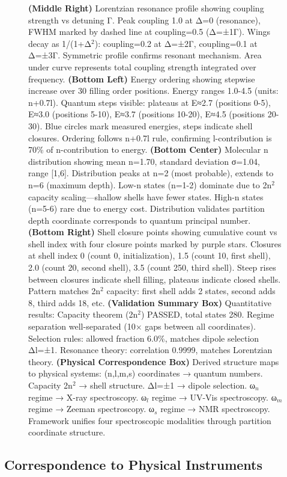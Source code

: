 \begin{figure}[htbp]
{    \textbf{(Middle Right)} Lorentzian resonance profile showing coupling strength vs detuning Γ. Peak coupling 1.0 at Δ=0 (resonance), FWHM marked by dashed line at coupling=0.5 (Δ=±1Γ). Wings decay as 1/(1+Δ$^2$): coupling=0.2 at Δ=±2Γ, coupling=0.1 at Δ=±3Γ. Symmetric profile confirms resonant mechanism. Area under curve represents total coupling strength integrated over frequency. 
    \textbf{(Bottom Left)} Energy ordering showing stepwise increase over 30 filling order positions. Energy ranges 1.0-4.5 (units: n+0.7l). Quantum steps visible: plateaus at E≈2.7 (positions 0-5), E≈3.0 (positions 5-10), E≈3.7 (positions 10-20), E≈4.5 (positions 20-30). Blue circles mark measured energies, steps indicate shell closures. Ordering follows n+0.7l rule, confirming l-contribution is 70\% of n-contribution to energy. 
    \textbf{(Bottom Center)} Molecular n distribution showing mean n=1.70, standard deviation σ=1.04, range [1,6]. Distribution peaks at n=2 (most probable), extends to n=6 (maximum depth). Low-n states (n=1-2) dominate due to 2n$^2$ capacity scaling—shallow shells have fewer states. High-n states (n=5-6) rare due to energy cost. Distribution validates partition depth coordinate corresponds to quantum principal number. 
    \textbf{(Bottom Right)} Shell closure points showing cumulative count vs shell index with four closure points marked by purple stars. Closures at shell index 0 (count 0, initialization), 1.5 (count 10, first shell), 2.0 (count 20, second shell), 3.5 (count 250, third shell). Steep rises between closures indicate shell filling, plateaus indicate closed shells. Pattern matches 2n$^2$ capacity: first shell adds 2 states, second adds 8, third adds 18, etc. 
    \textbf{(Validation Summary Box)} Quantitative results: Capacity theorem (2n$^2$) PASSED, total states 280. Regime separation well-separated (10× gaps between all coordinates). Selection rules: allowed fraction 6.0\%, matches dipole selection Δl=±1. Resonance theory: correlation 0.9999, matches Lorentzian theory. 
    \textbf{(Physical Correspondence Box)} Derived structure maps to physical systems: (n,l,m,s) coordinates → quantum numbers. Capacity 2n$^2$ → shell structure. Δl=±1 → dipole selection. ω$_n$ regime → X-ray spectroscopy. ω$_l$ regime → UV-Vis spectroscopy. ω$_m$ regime → Zeeman spectroscopy. ω$_s$ regime → NMR spectroscopy. Framework unifies four spectroscopic modalities through partition coordinate structure.}
    \label{fig:partition_coordinate_validation}
\end{figure}

\subsection{Correspondence to Physical Instruments}


